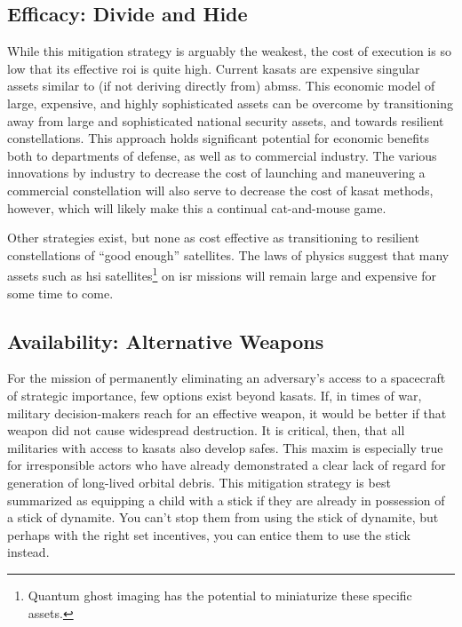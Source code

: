 \subsection*{Efficacy: Divide and Hide}
While this mitigation strategy is arguably the weakest, the cost of
execution is so low that its effective \ac{roi} is quite high.
Current \acp{kasat} are expensive singular assets similar to (if not
deriving directly from) \acp{abms}.  This economic model of large,
expensive, and highly sophisticated assets can be overcome by
transitioning away from large and sophisticated national security
assets, and towards resilient constellations.  This approach holds
significant potential for economic benefits both to departments of
defense, as well as to commercial industry.\cite{big-risks} The
various innovations by industry to decrease the cost of launching and
maneuvering a commercial constellation will also serve to decrease the
cost of \ac{kasat} methods, however, which will likely make this a
continual cat-and-mouse game.

Other strategies exist, but none as cost effective as transitioning to
resilient constellations of ``good enough'' satellites.  The laws of
physics suggest that many assets such as \ac{hsi}
satellites\footnote{Quantum ghost imaging has the potential to
miniaturize these specific assets.} on \ac{isr} missions will remain
large and expensive for some time to come.

\subsection*{Availability: Alternative Weapons}
For the mission of permanently eliminating an adversary's access to a
spacecraft of strategic importance, few options exist beyond
\acp{kasat}.  If, in times of war, military decision-makers reach for
an effective weapon, it would be better if that weapon did not cause
widespread destruction.  It is critical, then, that all militaries
with access to \acp{kasat} also develop \acp{safe}.  This maxim is
especially true for irresponsible actors who have already demonstrated
a clear lack of regard for generation of long-lived orbital debris.
This mitigation strategy is best summarized as equipping a child with
a stick if they are already in possession of a stick of dynamite.  You
can't stop them from using the stick of dynamite, but perhaps with the
right set incentives, you can entice them to use the stick instead.

